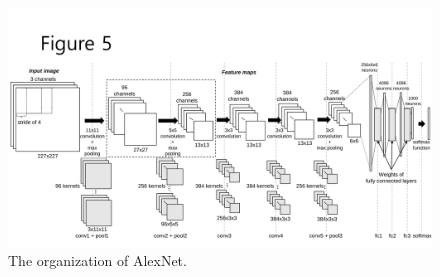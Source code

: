 \begin{figure}[htbp]
  \centering
  \includegraphics[width=\linewidth]{./figures/Alex}
  \caption{The organization of AlexNet.}
  \label{fig_Alex}
\end{figure}

